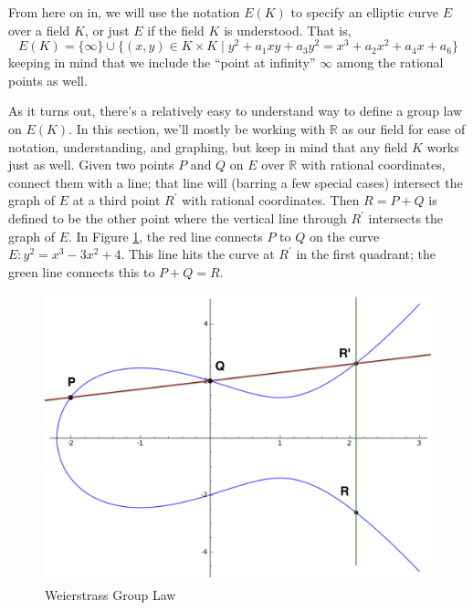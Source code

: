 From here on in, we will use the notation $E(K)$ to specify an elliptic curve
    $E$ over a field $K$, or just $E$ if the field $K$ is understood.
That is,
\[
E(K) = \{\infty\} \cup \{(x, y) \in K \times K \mid 
    y^2 + a_1xy + a_3y^2 = x^3 + a_2x^2 + a_4x + a_6\}
\]
    keeping in mind that we include the ``point at infinity'' $\infty$ among
    the rational points as well.



As it turns out, there's a relatively easy to understand way to define a group
    law on $E(K)$.
In this section, we'll mostly be working with $\mathbb{R}$ as our field for
    ease of notation, understanding, and graphing, but keep in mind that any
    field $K$ works just as well.
Given two points $P$ and $Q$ on $E$ over $\mathbb{R}$ with rational
    coordinates, connect them with a line; that line will (barring a few
    special cases) intersect the graph of $E$ at a third point $R^\prime$ with
    rational coordinates.
Then $R = P + Q$ is defined to be the other point where the vertical line
    through $R^\prime$ intersects the graph of $E$.
In Figure \ref{fig:wgl}, the red line connects $P$ to $Q$ on the curve
    $E: y^2 = x^3 - 3x^2 + 4$.
This line hits the curve at $R^\prime$ in the first quadrant; the green line
    connects this to $P + Q = R$.
\begin{figure}[htbp]
  \centering
  \includegraphics[scale=0.5]{figures/wgl.png}
  \caption{Weierstrass Group Law}
  \label{fig:wgl}
\end{figure}


